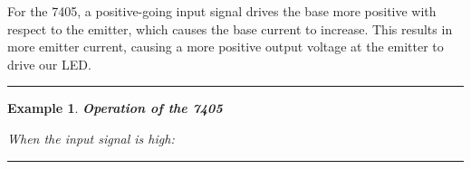 \documentclass[12pt]{report}
\newtheorem{example}{Example}
\newenvironment{examp}
{\vspace{0.5cm}
\hrule
\begin{example}}
{\hrule
\vspace{0.5cm}
\end{example}}
\begin{document}
For the 7405, a positive-going input signal drives the base more positive with respect to the emitter, which causes the base current to increase. This results in more emitter current, causing a more positive output voltage at the emitter to drive our LED.
\begin{examp}
	\textbf{Operation of the 7405}
	\begin{figure}[h]
		\hfill
	\end{figure}
	\newline
	\textnormal{When the input signal is high:}
	\begin{itemize}


\end{itemize}
\end{examp}
\end{document}
